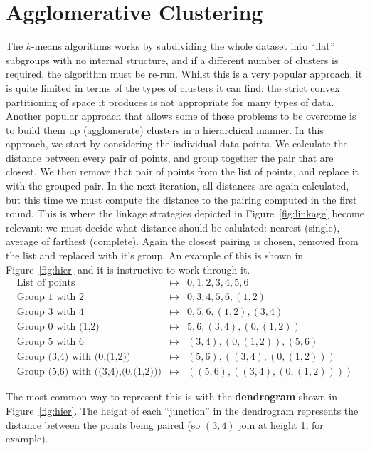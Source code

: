 \documentclass[12pt,a4paper]{tufte-handout}
\begin{document}
\section{Agglomerative Clustering}
The $k$-means algorithms works by subdividing the whole dataset into ``flat'' subgroups with no internal structure, and if a different number of clusters is required, the algorithm must be re-run. Whilst this is a very popular approach, it is quite limited in terms of the types of clusters it can find: the strict convex partitioning of space it produces is not appropriate for many types of data. Another popular approach that allows some of these problems to be overcome is to build them up (agglomerate) clusters in a hierarchical manner. In this approach, we start by considering the individual data points. We calculate the distance between every pair of points, and group together the pair that are closest. We then remove that pair of points from the list of points, and replace it with the grouped pair. In the next iteration, all distances are again calculated, but this time we must compute the distance to the pairing computed in the first round. This is where the linkage strategies depicted in Figure~\ref{fig:linkage} become relevant: we must decide what distance should be calulated: nearest (single), average of farthest (complete). Again the closest pairing is chosen, removed from the list and replaced with it's group. An example of this is shown in Figure~\ref{fig:hier} and it is instructive to work through it. 
\begin{eqnarray*}
\mbox{List of points}&\mapsto&0,1,2,3,4,5,6\\
\mbox{Group 1 with 2}&\mapsto&0,3,4,5,6,(1,2)\\
\mbox{Group 3 with 4}&\mapsto&0,5,6,(1,2),(3,4)\\
\mbox{Group 0 with (1,2)}&\mapsto&5,6,(3,4),(0,(1,2))\\
\mbox{Group 5 with 6}&\mapsto&(3,4),(0,(1,2)),(5,6)\\
\mbox{Group (3,4) with (0,(1,2))}&\mapsto&(5,6),((3,4),(0,(1,2)))\\
\mbox{Group (5,6) with ((3,4),(0,(1,2)))}&\mapsto&((5,6),((3,4),(0,(1,2))))
\end{eqnarray*}

The most common way to represent this is with the \textbf{dendrogram} shown in Figure~\ref{fig:hier}. The height of each ``junction'' in the dendrogram represents the distance between the points being paired (so $(3,4)$ join at height 1, for example).
\end{document}
